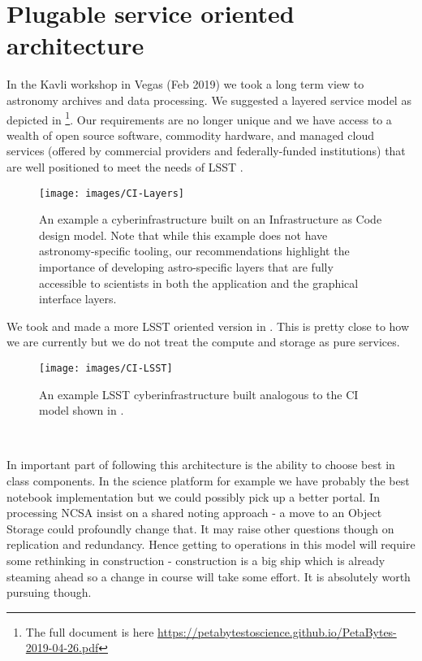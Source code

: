 
\section{Plugable service oriented architecture} \label{sec:arc}

In the Kavli workshop in Vegas (Feb 2019) we took a long term view to astronomy archives and data processing.
We suggested a layered service model as depicted in \footnote{The full document is here \url{https://petabytestoscience.github.io/PetaBytes-2019-04-26.pdf}}.
Our requirements are no longer unique and we have access to a wealth of open source \gls{software}, commodity hardware, and managed \gls{cloud} services (offered by commercial providers and federally-funded institutions) that are well positioned to meet the needs of \gls{LSST} \cite{2019AAS...23345706M, 2019AAS...23324505B}.


\begin{figure}
    \centering
    \texttt{[image: images/CI-Layers]}
    \caption{An example a \gls{cyberinfrastructure} built on an Infrastructure as Code design model. Note that while this example does not have astronomy-specific tooling, our recommendations highlight the importance of developing astro-specific layers that are fully accessible to scientists in both  the application  and the graphical interface layers. \label{fig:CI}}
\end{figure}


We took  and made a more \gls{LSST} oriented version in . This is pretty close to how we are currently but we do not treat the compute and storage as pure services.

\begin{figure}
    \centering
    \texttt{[image: images/CI-LSST]}
    \caption{An example \gls{LSST}  \gls{cyberinfrastructure} built analogous to the \gls{CI} model shown in .}
    \label{fig:CI-LSST}
\end{figure}\

In important part of following this architecture is the ability to choose best in class components. In the science platform for example we have probably the best notebook implementation but we could possibly pick up a better portal. In processing \gls{NCSA} insist on  a shared noting approach - a move to an \gls{Object Storage} could profoundly change that. It may raise other questions though on replication and redundancy. Hence getting to operations in this model will require some rethinking in construction - construction is a big ship which is already steaming ahead so a change in course will take some effort. It is absolutely worth pursuing though.


